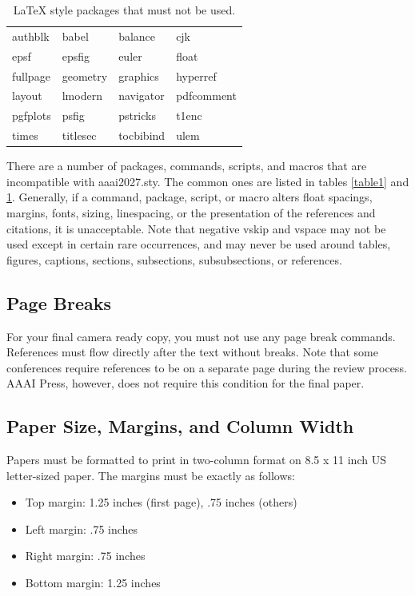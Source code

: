\begin{table}[t]
\centering
\begin{tabular}{llll}
  \toprule
    authblk & babel & balance & cjk \\
    epsf & epsfig & euler & float \\
    fullpage & geometry & graphics & hyperref \\
    layout & lmodern & navigator & pdfcomment \\
    pgfplots & psfig & pstricks & t1enc \\
    times & titlesec & tocbibind & ulem \\
  \bottomrule
\end{tabular}
\caption{LaTeX style packages that must not be used.}
\label{table2}
\end{table}

There are a number of packages, commands, scripts, and macros that are incompatible with aaai2027.sty. The common ones are listed in tables \ref{table1} and \ref{table2}. Generally, if a command, package, script, or macro alters float spacings, margins, fonts, sizing, linespacing, or the presentation of the references and citations, it is unacceptable. Note that negative vskip and vspace may not be used except in certain rare occurrences, and may never be used around tables, figures, captions, sections, subsections, subsubsections, or references.


\subsection{Page Breaks}
For your final camera ready copy, you must not use any page break commands. References must flow directly after the text without breaks. Note that some conferences require references to be on a separate page during the review process. AAAI Press, however, does not require this condition for the final paper.


\subsection{Paper Size, Margins, and Column Width}
Papers must be formatted to print in two-column format on 8.5 x 11 inch US letter-sized paper. The margins must be exactly as follows:
\begin{itemize}
\item Top margin: 1.25 inches (first page), .75 inches (others)
\item Left margin: .75 inches
\item Right margin: .75 inches
\item Bottom margin: 1.25 inches
\end{itemize}


